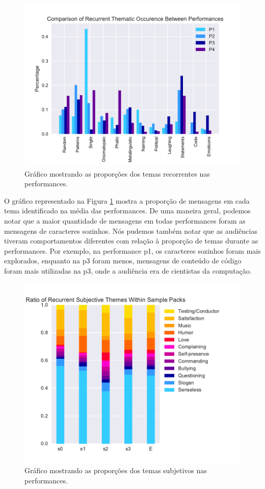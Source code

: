 \begin{figure}[ht!]

\includegraphics[width=1\linewidth]{pictures/cap3/bar_plot_new_revised}
\caption{Gráfico mostrando as proporções dos temas recorrentes nas performances.}
\label{donut}
\end{figure}

O gráfico representado na Figura \ref{donut} mostra a proporção de mensagens em cada tema identificado na média das performances. De uma maneira geral, podemos notar que a maior quantidade de mensagens em todas performances foram as mensagens de caracteres sozinhos. Nós pudemos também notar que as audiências tiveram comportamentos diferentes com relação à proporção de temas durante as performances. Por exemplo, na performance p1, os caracteres sozinhos foram mais explorados, enquanto na p3 foram menos, mensagens de conteúdo de código foram mais utilizadas na p3, onde a audiência era de cientistas da computação.

\begin{figure}[ht!]

\includegraphics[width=1\linewidth]{pictures/cap3/subj_themes}
\caption{Gráfico mostrando as proporções dos temas subjetivos nas performances.}
\label{subj}
\end{figure}


